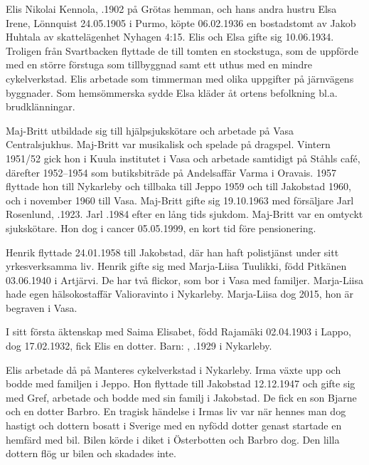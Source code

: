 Elis Nikolai Kennola, .1902 på Grötas hemman, och hans	andra hustru Elsa Irene, \textborn Lönnquist 24.05.1905 i Purmo, köpte	06.02.1936 en bostadstomt av Jakob Huhtala av skattelägenhet Nyhagen 4:15. Elis och Elsa gifte sig 10.06.1934. Troligen från Svartbacken flyttade de till tomten en stockstuga, som de uppförde med en större förstuga som tillbyggnad samt ett uthus med en mindre	cykelverkstad. Elis arbetade som timmerman med olika uppgifter på järnvägens byggnader. Som hemsömmerska sydde Elsa kläder åt ortens	befolkning bl.a. brudklänningar.
\begin{jhchildren}
  \item {}
  \item {}
\end{jhchildren}

Maj-Britt utbildade sig till hjälpsjukskötare och arbetade på Vasa Centralsjukhus. Maj-Britt var musikalisk och spelade på dragspel. Vintern 1951/52 gick hon i Kuula institutet i Vasa	 och arbetade samtidigt på Ståhls café, därefter 1952--1954 som butiksbiträde på Andelsaffär Varma i Oravais. 1957 flyttade hon till Nykarleby och tillbaka till Jeppo 1959 och till Jakobstad 1960, och i november 1960 till Vasa. Maj-Britt 	gifte sig 19.10.1963 med försäljare Jarl Rosenlund, .1923. Jarl .1984 efter en lång tids sjukdom. Maj-Britt var en omtyckt sjukskötare. Hon dog i cancer 05.05.1999, en kort tid före pensionering.

Henrik flyttade 24.01.1958 till Jakobstad, där han haft polistjänst under sitt yrkesverksamma liv. Henrik gifte sig med Marja-Liisa Tuulikki, född 	Pitkänen 03.06.1940 i Artjärvi. De har två flickor, som bor i Vasa med	familjer. Marja-Liisa hade egen hälsokostaffär Valioravinto i Nykarleby. 	Marja-Liisa	dog 2015, hon är begraven i Vasa.

I sitt första äktenskap med Saima Elisabet, född Rajamäki 02.04.1903 i Lappo, dog 17.02.1932, fick Elis en dotter.
Barn: , .1929 i Nykarleby.

Elis arbetade då på Manteres cykelverkstad i Nykarleby. Irma växte upp och bodde med familjen i Jeppo. Hon flyttade till Jakobstad 12.12.1947 och gifte sig med Gref, arbetade och bodde med sin familj i Jakobstad. De fick en son Bjarne och en dotter Barbro. En tragisk	händelse i Irmas liv var när hennes man dog hastigt och dottern	bosatt i Sverige med en nyfödd dotter genast startade en hemfärd med 	bil. Bilen körde i diket i Österbotten och Barbro dog. Den lilla dottern flög ur bilen och skadades inte.

